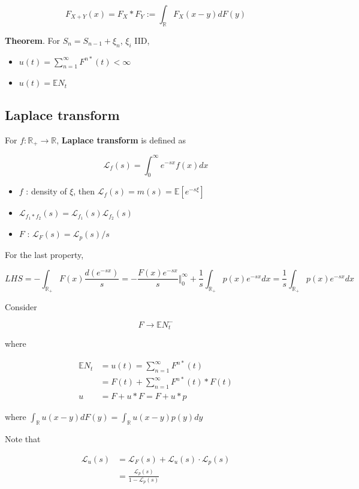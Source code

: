 \documentclass[12pt]{article}
\theoremstyle{nonumberbreak}
\begin{document}
$$
F_{X+Y}(x) = F_X \ast F_Y := \int_{\mathbb{R}} F_X(x-y) dF(y)
$$

\begin{theorem}
\textbf{Theorem}. For $S_n = S_{n-1} + \xi_n$, $\xi_i$ IID,
\begin{itemize}
	\item $u(t) = \sum_{n=1}^\infty F^{n\ast} (t) < \infty$
	\item $u(t) = \mathbb{E} N_t$
\end{itemize}
\end{theorem}

\subsection{Laplace transform}

For $f : \mathbb{R}_+ \to \mathbb{R}$, \textbf{Laplace transform} is defined as 

$$
\mathcal{L}_f(s) = \int_0^\infty e^{-sx} f(x) dx
$$

\begin{itemize}
	\item $f$ : density of $\xi$, then $\mathcal{L}_f(s) = m(s) = \mathbb{E}[e^{-s\xi}]$
	\item $\mathcal{L}_{f_1 \ast f_2} (s) = \mathcal{L}_{f_1} (s) \mathcal{L}_{f_2} (s)$ 
	\item $F$ : $\mathcal{L}_F(s) = \mathcal{L}_p(s)/s$
\end{itemize}

For the last property,

$$
LHS = -\int_{\mathbb{R}_+} F(x) \frac{d(e^{-sx})}{s} = - \frac{F(x)e^{-sx}}{s} \Vert_0^\infty + \frac{1}{s} \int_{\mathbb{R}_+}p(x) e^{-sx}dx = \frac{1}{s} \int_{\mathbb{R}_+}p(x) e^{-sx}dx
$$


Consider

$$
F \to \mathbb{E} N_t^{-}
$$

where 

$$
\begin{aligned}
\mathbb{E} N_t &= u(t) = \sum_{n=1}^\infty F^{n\ast} (t) \\[8pt]
&= F(t) + \sum_{n=1}^\infty F^{n\ast} (t) \ast F(t) \\[10pt]
u&= F + u \ast F = F + u \ast p
\end{aligned}
$$

where $\int_\mathbb{R} u(x-y) dF(y) = \int_\mathbb{R} u(x-y) p(y) dy$


Note that 

$$
\begin{aligned}
\mathcal{L}_u (s) &= \mathcal{L}_F (s) + \mathcal{L}_u (s) \cdot \mathcal{L}_p (s) \\[8pt]
&= \frac{\mathcal{L}_p(s)}{1-\mathcal{L}_p(s)}
\end{aligned}
$$
\end{document}
